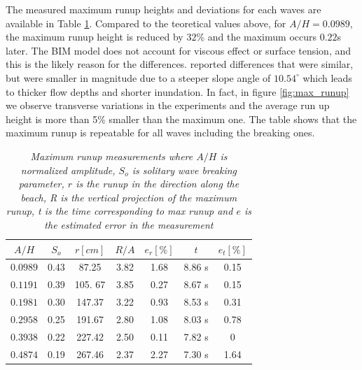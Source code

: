 \documentclass[review]{elsarticle}
\begin{document}
The measured maximum runup heights and deviations for each waves are available in Table \ref{tab:max_shore}. Compared to the teoretical values above, for $A/H=0.0989$,  the maximum runup height is reduced by $32$\% and the maximum occurs $0.22$s later.  The BIM model does not account for viscous effect or surface tension, and this is the likely reason for the differences. \cite{pedersen2013runup} reported differences that were similar, but were smaller in magnitude due to a steeper 
slope angle of $10.54 ^\circ$ which leads to thicker flow depths and shorter inundation. In fact, in figure \ref{fig:max_runup} we observe transverse variations in the experiments and the average
run up height is more than 5\% smaller than the maximum one.  The table shows that the maximum runup is repeatable for all waves including the breaking ones. %
\begin{table}[]
\caption{\textit{Maximum runup measurements where $A/H$ is normalized amplitude, $S_o $ is \citep{grilli1997breaking} solitary wave breaking parameter, $r$ is the runup in the direction along the beach, R is the vertical projection of the maximum runup, t is the time corresponding to max runup and $e$ is the estimated error in the measurement }}
\centering
\begin{tabular}{ccccccc}
\hline
         $A/H$& \textbf{$S_o$}     & $r [cm]$ &$R/A$ & $e_r [\%]$ & $t$ & $e_t [\%]$ \\ \hline
\textit{$0.0989$} &0.43 & 87.25    &    3.82  & 1.68             & 8.86 s        & 0.15               \\
\textit{$0.1191$} &0.39 & 105. 67   &    3.85   & 0.27             & 8.67 s        & 0.15               \\
\textit{$0.1981$} &0.30 & 147.37    &    3.22  & 0.93            & 8.53 s        & 0.31                \\
\textit{$0.2958$} &0.25 & 191.67     &   2.80  & 1.08           & 8.03 s        & 0.78              \\
\textit{$0.3938$} &0.22 & 227.42      &   2.50 & 0.11            & 7.82 s        & 0              \\
\textit{$0.4874$} &0.19 & 267.46       &    2.37 & 2.27            & 7.30 s        & 1.64              
\end{tabular}
\label{tab:max_shore}
\end{table}
\end{document}
